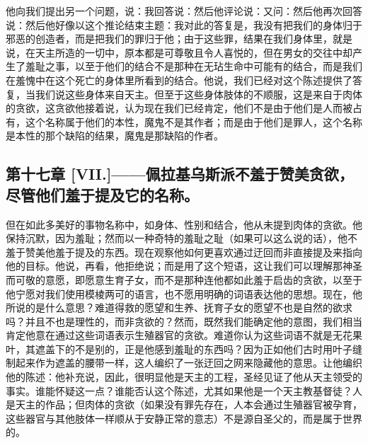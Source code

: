 他向我们提出另一个问题，说：我回答说：然后他评论说：又问：然后他再次回答说：然后他好像以这个推论结束主题：我对此的答复是，我没有把我们的身体归于邪恶的创造者，而是把我们的罪归于他；由于这些罪，结果在我们身体里，就是说，在天主所造的一切中，原本都是可尊敬且令人喜悦的，但在男女的交往中却产生了羞耻之事，以至于他们的结合不是那种在无玷生命中可能有的结合，而是我们在羞愧中在这个死亡的身体里所看到的结合。他说，我们已经对这个陈述提供了答复，当我们说这些身体来自天主。但至于这些身体肢体的不顺服，这是来自于肉体的贪欲，这贪欲他接着说，认为现在我们已经肯定，他们不是由于他们是人而被占有，这个名称属于他们的本性，魔鬼不是其作者；而是由于他们是罪人，这个名称是本性的那个缺陷的结果，魔鬼是那缺陷的作者。\par


\subsection{第十七章 [VII.]——佩拉基乌斯派不羞于赞美贪欲，尽管他们羞于提及它的名称。}

但在如此多美好的事物名称中，如身体、性别和结合，他从未提到肉体的贪欲。他保持沉默，因为羞耻；然而以一种奇特的羞耻之耻（如果可以这么说的话），他不羞于赞美他羞于提及的东西。现在观察他如何更喜欢通过迂回而非直接提及来指向他的目标。他说，再看，他拒绝说；而是用了这个短语，这让我们可以理解那神圣而可敬的意愿，即愿意生育子女，而不是那种连他都如此羞于启齿的贪欲，以至于他宁愿对我们使用模棱两可的语言，也不愿用明确的词语表达他的思想。现在，他所说的是什么意思？难道得救的愿望和生养、抚育子女的愿望不也是自然的欲求吗？并且不也是理性的，而非贪欲的？然而，既然我们能确定他的意图，我们相当肯定他意在通过这些词语表示生殖器官的贪欲。难道你认为这些词语不就是无花果叶，其遮盖下的不是别的，正是他感到羞耻的东西吗？因为正如他们古时用叶子缝制起来作为遮盖的腰带一样，这人编织了一张迂回之网来隐藏他的意思。让他编织他的陈述：他补充说，因此，很明显他是天主的工程，圣经见证了他从天主领受的事实。谁能怀疑这一点？谁能否认这个陈述，尤其如果他是一个天主教基督徒？人是天主的作品；但肉体的贪欲（如果没有罪先存在，人本会通过生殖器官被孕育，这些器官与其他肢体一样顺从于安静正常的意志）不是源自圣父的，而是属于世界的。\par

